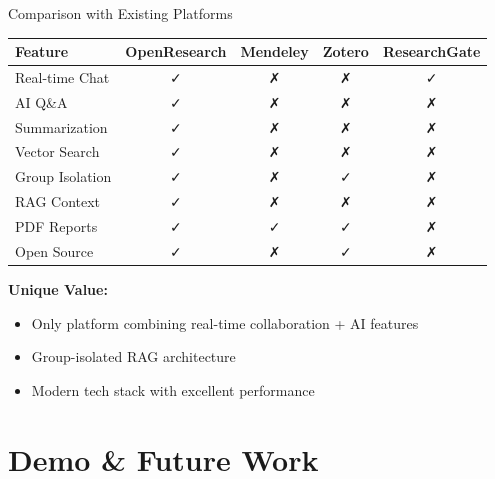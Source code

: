\documentclass{beamer}
\begin{document}
\begin{frame}{Comparison with Existing Platforms}

\begin{table}[H]
\centering
\tiny
\begin{tabular}{|l|c|c|c|c|}
\hline
\textbf{Feature} & \textbf{OpenResearch} & \textbf{Mendeley} & \textbf{Zotero} & \textbf{ResearchGate} \\
\hline
Real-time Chat & ✓ & ✗ & ✗ & ✓ \\
AI Q\&A & ✓ & ✗ & ✗ & ✗ \\
Summarization & ✓ & ✗ & ✗ & ✗ \\
Vector Search & ✓ & ✗ & ✗ & ✗ \\
Group Isolation & ✓ & ✗ & ✓ & ✗ \\
RAG Context & ✓ & ✗ & ✗ & ✗ \\
PDF Reports & ✓ & ✓ & ✓ & ✗ \\
Open Source & ✓ & ✗ & ✓ & ✗ \\
\hline
\end{tabular}
\end{table}

\textbf{Unique Value:}
\begin{itemize}
    \item Only platform combining real-time collaboration + AI features
    \item Group-isolated RAG architecture
    \item Modern tech stack with excellent performance
\end{itemize}

\end{frame}


\section{Demo \& Future Work}
\end{document}
